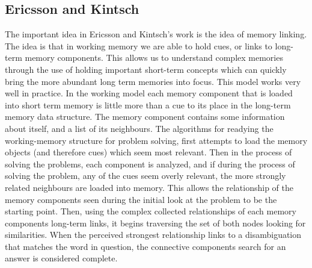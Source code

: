 \subsection{Ericsson and Kintsch}

The important idea in Ericsson and Kintsch's work is the idea of memory linking.  The idea is that in working memory we are able to hold cues, or links to long-term memory components.  This allows us to understand complex memories through the use of holding important short-term concepts which can quickly bring the more abundant long term memories into focus.  This model works very well in practice.  In the working model each memory component that is loaded into short term memory is little more than a cue to its place in the long-term memory data structure.  The memory component contains some information about itself, and a list of its neighbours.  The algorithms for readying the working-memory structure for problem solving, first attempts to load the memory objects (and therefore cues) which seem most relevant.  Then in the process of solving the problems, each component is analyzed, and if during the process of solving the problem, any of the cues seem overly relevant, the more strongly related neighbours are loaded into memory.  This allows the relationship of the memory components seen during the initial look at the problem to be the starting point. Then, using the complex collected relationships of each memory components long-term links, it begins traversing the set of both nodes looking for similarities.  When the perceived strongest relationship links to a disambiguation that matches the word in question, the connective components search for an answer is considered complete.

